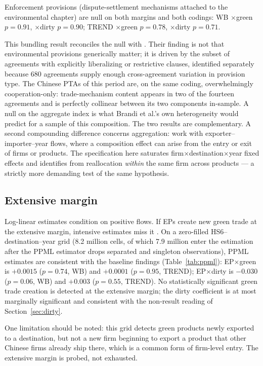 \documentclass[12pt]{article}
\begin{document}
Enforcement provisions (dispute-settlement mechanisms attached to the environmental
chapter) are null on both margins and both codings: WB $\times$green $p = 0.91$, $\times$dirty
$p = 0.90$; TREND $\times$green $p = 0.78$, $\times$dirty $p = 0.71$.

This bundling result reconciles the null with \citet{brandi2020}. Their finding is not
that environmental provisions generically matter; it is driven by the subset of agreements
with explicitly liberalizing or restrictive clauses, identified separately because 680
agreements supply enough cross-agreement variation in provision type. The Chinese PTAs of
this period are, on the same coding, overwhelmingly cooperation-only: trade-mechanism
content appears in two of the fourteen agreements and is perfectly collinear between its
two components in-sample. A null on the aggregate index is what Brandi et al.'s own
heterogeneity would predict for a sample of this composition. The two results are
complementary. A second compounding difference concerns aggregation: \citet{brandi2020}
work with exporter--importer--year flows, where a composition effect can arise from the
entry or exit of firms or products. The specification here saturates
firm$\times$destination$\times$year fixed effects and identifies from reallocation
\emph{within} the same firm across products --- a strictly more demanding test of the
same hypothesis.

\FloatBarrier
\subsection{Extensive margin}

Log-linear estimates condition on positive flows. If EPs create new green trade at the
extensive margin, intensive estimates miss it \citep{santossilva2006}. On a zero-filled
HS6--destination--year grid (8.2 million cells, of which 7.9 million enter the estimation after the PPML estimator drops separated and singleton observations), PPML estimates are consistent with the baseline findings (Table~\ref{tab:ppml}):
EP$\times$green is $+0.0015$ ($p = 0.74$, WB) and $+0.0001$ ($p = 0.95$, TREND);
EP$\times$dirty is $-0.030$ ($p = 0.06$, WB) and $+0.003$ ($p = 0.55$, TREND). No
statistically significant green trade creation is detected at the extensive margin; the dirty coefficient is at most marginally
significant and consistent with the non-result reading of Section~\ref{sec:dirty}.

One limitation should be noted: this grid detects green products newly exported to a
destination, but not a new firm beginning to export a product that other Chinese firms
already ship there, which is a common form of firm-level entry. The extensive margin is
probed, not exhausted.
\end{document}
